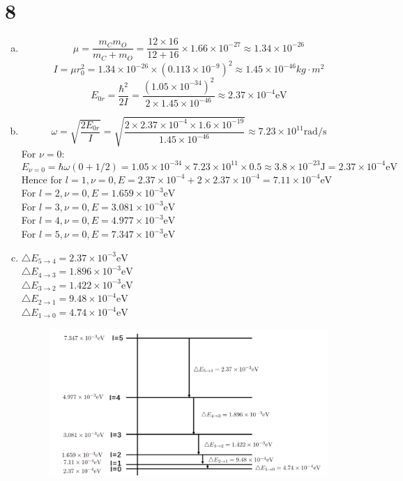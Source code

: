 \documentclass[a4paper]{article}
\begin{document}
\section{8}
\begin{enumerate}[(a)]
    \item $$\mu=\frac{m_Cm_O}{m_C+m_O}=\frac{12\times16}{12+16}\times1.66\times10^{-27}\approx1.34\times10^{-26}$$
    $$I=\mu r_0^2=1.34\times10^{-26}\times(0.113\times10^{-9})^2\approx1.45\times10^{-46}kg\cdot m^2$$
    $$E_{0r}=\frac{\hbar^2}{2I}=\frac{(1.05\times10^{-34})^2}{2\times1.45\times10^{-46}}\approx2.37\times10^{-4}\text{eV}$$
    \item $$\omega=\sqrt{\frac{2E_{0r}}{I}}=\sqrt{\frac{2\times2.37\times10^{-4}\times1.6\times10^{-19}}{1.45\times10^{-46}}}\approx7.23\times10^{11}\text{rad/s}$$
    For $\nu=0$:
    $$E_{\nu=0}=\hbar\omega(0+1/2)=1.05\times10^{-34}\times7.23\times10^{11}\times0.5\approx3.8\times10^{-23}\text{J}=2.37\times10^{-4}\text{eV}$$
    Hence for $l=1,\nu=0,E=2.37\times10^{-4}+2\times2.37\times10^{-4}=7.11\times10^{-4}\text{eV}$
    \\For $l=2,\nu=0,E=1.659\times10^{-3}\text{eV}$
    \\For $l=3,\nu=0,E=3.081\times10^{-3}\text{eV}$
    \\For $l=4,\nu=0,E=4.977\times10^{-3}\text{eV}$
    \\For $l=5,\nu=0,E=7.347\times10^{-3}\text{eV}$
    \item
    $\bigtriangleup E_{5\rightarrow 4}=2.37\times10^{-3}\text{eV}$
    \\$\bigtriangleup E_{4\rightarrow 3}=1.896\times10^{-3}\text{eV}$
    \\$\bigtriangleup E_{3\rightarrow 2}=1.422\times10^{-3}\text{eV}$
    \\$\bigtriangleup E_{2\rightarrow 1}=9.48\times10^{-4}\text{eV}$
    \\$\bigtriangleup E_{1\rightarrow 0}=4.74\times10^{-4}\text{eV}$
    \begin{figure}[H]
    \centering
    \includegraphics[scale=0.25]{P1.PNG}

\end{figure}
\end{enumerate}
\end{document}
